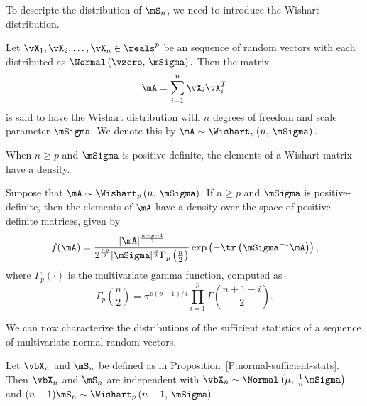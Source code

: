 To descripte the distribution of $\mS_n$, we need to introduce the 
Wishart distribution.

\begin{definition}\label{D:wishart}
Let $\vX_1, \vX_2, \ldots, \vX_n \in \reals^p$ be an \iid sequence of
random vectors with each distributed as
\(
    \Normal \left(
        \vzero, \,
        \mSigma
    \right).
\)
Then the matrix
\[
    \mA = \sum_{i=1}^n \vX_i \vX_i^T
\]
is said to have the Wishart distribution with $n$ degrees of freedom and scale parameter $\mSigma$.  We denote this by
\(
    \mA
    \sim
    \Wishart_p \left(
        n, \,
        \mSigma
    \right).
\)
\end{definition}

\noindent
When $n \geq p$ and $\mSigma$ is positive-definite, the elements of a Wishart matrix have a density.
\begin{proposition}
Suppose that
\(
    \mA
    \sim
    \Wishart_p \left(
        n, \,
        \mSigma
    \right)
\).
If $n \geq p$ and $\mSigma$ is positive-definite, then the elements of $\mA$ have a density over the space of positive-definite matrices, given by
\begin{equation}\label{E:wishart-density}
    f( \mA )
    =
    \frac{ |\mA|^\frac{n-p-1}{2} }
         { 2^\frac{np}{2} 
           |\mSigma|^\frac{n}{2} 
           \Gamma_p \left( \frac{n}{2} \right) }
    \exp \left(
        -
        \tr \left(
            \mSigma^{-1} \mA
        \right)
    \right),
\end{equation}
where
\(
    \Gamma_p \left( \cdot \right)
\)
is the multivariate gamma function, computed as
\begin{equation}
    \Gamma_p \left( \frac{n}{2} \right)
    =
    \pi^{p(p-1)/4}
    \prod_{i=1}^p
        \Gamma \left(
            \frac{n + 1 - i}{2}
        \right).
\end{equation}
\end{proposition}

We can now characterize the distributions of the sufficient statistics of a sequence of \iid multivariate normal random vectors.

\begin{proposition}
Let 
\(
    \vbX_n
\) 
and 
\(
    \mS_n
\)
be defined as in Proposition~\ref{P:normal-sufficient-stats}.  Then
\(
    \vbX_n
\)
and
\(
    \mS_n
\)
are independent with
\(
    \vbX_n
    \sim
    \Normal \left(
        \mu, \,
        \frac{1}{n}
        \mSigma
    \right)
\)
and
\(
    (n-1)
    \mS_n
    \sim
    \Wishart_p \left(
        n-1, \,
        \mSigma
    \right)
\).
\end{proposition}

